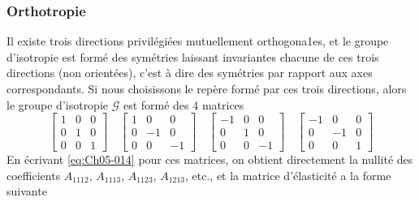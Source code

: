 \subsubsection{Orthotropie}
Il existe trois directions privilégiées mutuellement orthogona1es, et le groupe d'isotropie est formé des symétries laissant invariantes chacune de ces trois directions (non orientées), c'est à dire des symétries par rapport aux axes correspondants.
Si nous choisissons le repère formé par ces trois directions, alors le groupe d'isotropie $\mathcal{G}$ est formé des 4 matrices 
\begin{equation}
    \begin{bmatrix}
        1 & 0 & 0 \\
        0 & 1 & 0 \\
        0 & 0 & 1
    \end{bmatrix}
    \quad
    \begin{bmatrix}
        1 & 0 & 0 \\
        0 & -1 & 0 \\
        0 & 0 & -1
    \end{bmatrix}
    \quad
    \begin{bmatrix}
        -1 & 0 & 0 \\
        0 & 1 & 0 \\
        0 & 0 & -1
    \end{bmatrix}
    \quad
    \begin{bmatrix}
        -1 & 0 & 0 \\
        0 & -1 & 0 \\
        0 & 0 & 1
    \end{bmatrix}
    \label{eq:Ch05-015}
\end{equation}
En écrivant \eqref{eq:Ch05-014} pour ces matrices, on obtient directement la nullité des coefficients $A_{1112}$, $A_{1113}$, $A_{1123}$, $A_{1213}$, etc., et la matrice d'élasticité a la forme suivante 
